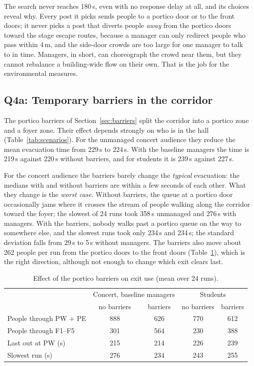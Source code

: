 \documentclass{article}
\begin{document}
The search never reaches 180\,s, even with no response delay at all, and its choices reveal why. Every post it picks sends people to a portico door or to the front doors; it never picks a post that diverts people \emph{away} from the portico doors toward the stage escape routes, because a manager can only redirect people who pass within 4\,m, and the side-door crowds are too large for one manager to talk to in time. Managers, in short, can choreograph the crowd near them, but they cannot rebalance a building-wide flow on their own. That is the job for the environmental measures.

\subsection{Q4a: Temporary barriers in the corridor}
The portico barriers of Section~\ref{sec:barriers} split the corridor into a portico zone and a foyer zone. Their effect depends strongly on who is in the hall (Table~\ref{tab:scenarios}). For the unmanaged concert audience they reduce the mean evacuation time from 229\,s to 224\,s. With the baseline managers the time is 219\,s against 220\,s without barriers, and for students it is 239\,s against 227\,s.

For the concert audience the barriers barely change the \emph{typical} evacuation: the medians with and without barriers are within a few seconds of each other. What they change is the \emph{worst case}. Without barriers, the queue at a portico door occasionally jams where it crosses the stream of people walking along the corridor toward the foyer; the slowest of 24 runs took 358\,s unmanaged and 276\,s with managers. With the barriers, nobody walks past a portico queue on the way to somewhere else, and the slowest runs took only 234\,s and 234\,s; the standard deviation falls from 29\,s to 5\,s without managers. The barriers also move about 262 people per run from the portico doors to the front doors (Table~\ref{tab:barrier_exits}), which is the right direction, although not enough to change which exit clears last.

\begin{table}[H]
    \centering
    \small
    \begin{tabular}{lcccc}
        \toprule
        & \multicolumn{2}{c}{Concert, baseline managers} & \multicolumn{2}{c}{Students}\\
        & no barriers & barriers & no barriers & barriers\\
        \midrule
        People through PW + PE & 888 & 626 & 770 & 612\\
        People through F1--F5 & 301 & 564 & 230 & 388\\
        Last out at PW (s) & 215 & 214 & 226 & 239\\
        Slowest run (s) & 276 & 234 & 243 & 255\\
        \bottomrule
    \end{tabular}
    \caption{Effect of the portico barriers on exit use (mean over 24 runs).}
    \label{tab:barrier_exits}
\end{table}
\end{document}
